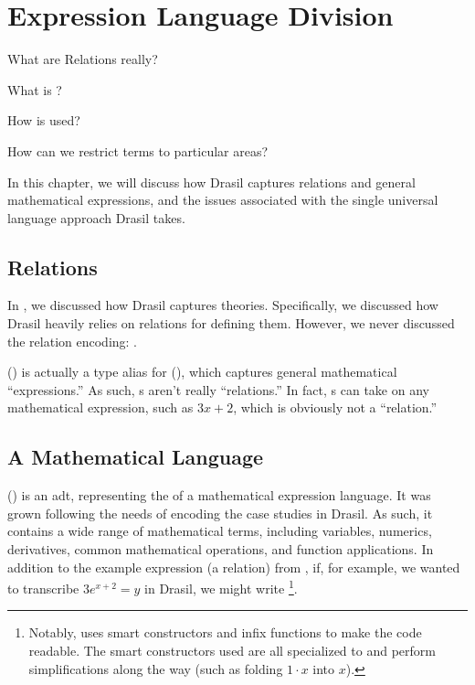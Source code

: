 \chapter{Expression Language Division}
\label{chap:lang-division}

\begin{writingdirectives}
    \item What are Relations really?
    \item What is \Expr{}?
    \item How is \Expr{} used?
    \item How can we restrict \Expr{} terms to particular areas?
\end{writingdirectives}

In this chapter, we will discuss how Drasil captures relations and general
mathematical expressions, and the issues associated with the single universal
language approach Drasil takes.

\section{Relations}
\label{chap:lang-division:sec:relations}

In , we discussed how Drasil captures theories.
Specifically, we discussed how Drasil heavily relies on relations for defining
them. However, we never discussed the relation encoding: \Relation{}.

\originalRelation{}

\Relation{} () is actually a type alias for \Expr{}
(), which captures general mathematical
``expressions.'' As such, \Relation{}s aren't really ``relations.'' In fact,
\Relation{}s can take on any mathematical expression, such as \(3x+2\), which is
obviously not a ``relation.''

\originalExprHaskell{}

\section{A Mathematical Language}
\label{chap:lang-division:sec:a-mathematical-language}

\Expr{} () is an \acs{adt}, representing the 
of a mathematical expression language. It was grown following the needs of
encoding the case studies in Drasil. As such, it contains a wide range of
mathematical terms, including variables, numerics, derivatives, common
mathematical operations, and function applications. In addition to the example
expression (a relation) from , if, for
example, we wanted to transcribe \(3 e^{x + 2} = y\) in Drasil, we might write
\footnote{Notably, 
uses smart constructors and infix functions to make the code readable. The smart
constructors used are all specialized to \Expr{} and perform simplifications
along the way (such as folding \(1 \cdot x\) into \(x\)).}.

